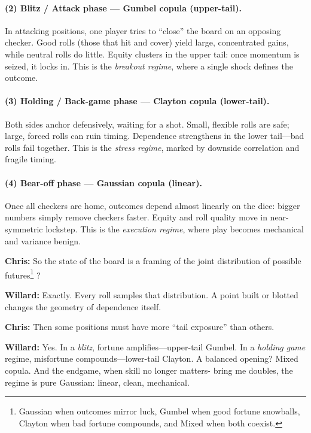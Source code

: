 \paragraph{(2) Blitz / Attack phase — Gumbel copula (upper-tail).}
In attacking positions, one player tries to ``close'' the board on an opposing checker.
Good rolls (those that hit and cover) yield large, concentrated gains,
while neutral rolls do little.
Equity clusters in the upper tail: once momentum is seized, it locks in.
This is the \emph{breakout regime}, where a single shock defines the outcome.

\paragraph{(3) Holding / Back-game phase — Clayton copula (lower-tail).}
Both sides anchor defensively, waiting for a shot.
Small, flexible rolls are safe; large, forced rolls can ruin timing.
Dependence strengthens in the lower tail—bad rolls fail together.
This is the \emph{stress regime}, marked by downside correlation and fragile timing.

\paragraph{(4) Bear-off phase — Gaussian copula (linear).}
Once all checkers are home, outcomes depend almost linearly on the dice:
bigger numbers simply remove checkers faster.
Equity and roll quality move in near-symmetric lockstep.
This is the \emph{execution regime}, where play becomes mechanical and variance benign.

\vspace{0.2em}
\textbf{Chris:}  
So the state of the board is a framing of the joint distribution of possible futures\footnote{Gaussian when outcomes mirror luck, Gumbel when good fortune snowballs,
Clayton when bad fortune compounds, and Mixed when both coexist.}  ?

\textbf{Willard:}  
Exactly.   Every roll samples that distribution.   
A point built or blotted changes the geometry of dependence itself.

\textbf{Chris:}  
Then some positions must have more “tail exposure” than others.

\textbf{Willard:}  
Yes. In a {\em blitz}, fortune amplifies—upper-tail Gumbel.  In a \emph{holding game} regime, misfortune compounds—lower-tail Clayton.  A balanced opening? Mixed copula.  And the endgame, when skill no longer matters- bring me doubles, the regime is  pure Gaussian: linear, clean, mechanical.

